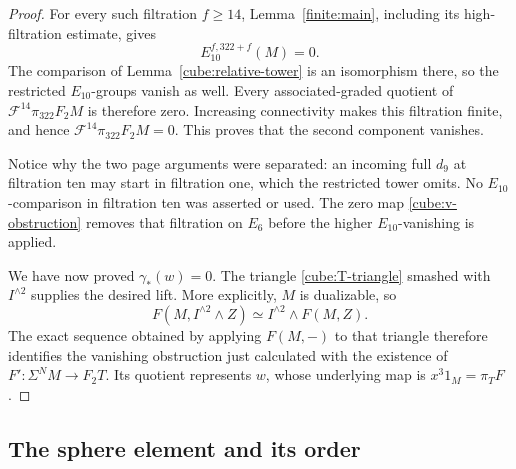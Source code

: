 \documentclass[11pt]{article}
\theoremstyle{definition}
\theoremstyle{remark}
\numberwithin{equation}{section}
\begin{document}
\begin{proof}
For every such filtration \(f\geq14\),
Lemma~\ref{finite:main}, including its high-filtration
estimate, gives
\[
 E_{10}^{f,322+f}(M)=0.
\]
The comparison of Lemma~\ref{cube:relative-tower}
is an isomorphism there, so the restricted
\(E_{10}\)-groups vanish as well.  Every
associated-graded quotient of
\(\mathcal F^{14}\pi_{322}F_2M\) is therefore zero.
Increasing connectivity makes this filtration
finite, and hence
\(\mathcal F^{14}\pi_{322}F_2M=0\).
This proves that the second component vanishes.

Notice why the two page arguments were separated:
an incoming full \(d_9\) at filtration ten may
start in filtration one, which the restricted
tower omits.  No \(E_{10}\)-comparison in
filtration ten was asserted or used.  The zero
map \eqref{cube:v-obstruction} removes that
filtration on \(E_6\) before the higher
\(E_{10}\)-vanishing is applied.

We have now proved \(\gamma_*(w)=0\).
The triangle \eqref{cube:T-triangle} smashed with
\(I^{\wedge2}\) supplies the desired lift.
More explicitly, \(M\) is dualizable, so
\[
 F(M,I^{\wedge2}\wedge Z)
   \simeq I^{\wedge2}\wedge F(M,Z).
 \]
The exact sequence obtained by applying \(F(M,-)\)
to that triangle therefore identifies the
vanishing obstruction just calculated with the
existence of \(F':\Sigma^NM\to F_2T\).
Its quotient represents \(w\), whose underlying
map is \(x^3 1_M=\pi_TF\).
\end{proof}

\subsection{The sphere element and its order}
\end{document}
